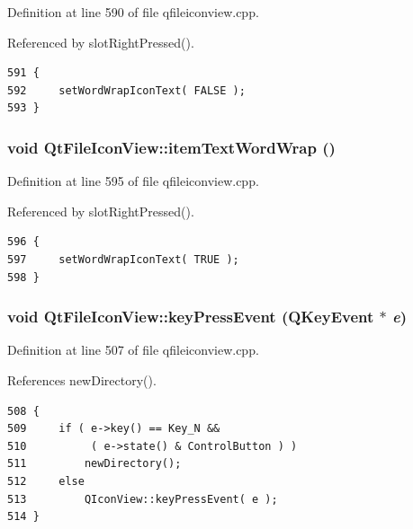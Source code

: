 Definition at line 590 of file qfileiconview.cpp.

Referenced by slot\-Right\-Pressed().



\footnotesize\begin{verbatim}591 {
592     setWordWrapIconText( FALSE );
593 }
\end{verbatim}\normalsize 
{}
\subsubsection{\setlength{\rightskip}{0pt plus 5cm}void Qt\-File\-Icon\-View::item\-Text\-Word\-Wrap ()\hspace{0.3cm}{\tt  [protected, slot]}}\label{classQtFileIconView_QtFileIconViewj10}




Definition at line 595 of file qfileiconview.cpp.

Referenced by slot\-Right\-Pressed().



\footnotesize\begin{verbatim}596 {
597     setWordWrapIconText( TRUE );
598 }
\end{verbatim}\normalsize 
{}
\subsubsection{\setlength{\rightskip}{0pt plus 5cm}void Qt\-File\-Icon\-View::key\-Press\-Event (QKey\-Event $\ast$ {\em e})\hspace{0.3cm}{\tt  [protected, virtual]}}\label{classQtFileIconView_QtFileIconViewb2}




Definition at line 507 of file qfileiconview.cpp.

References new\-Directory().



\footnotesize\begin{verbatim}508 {
509     if ( e->key() == Key_N &&
510          ( e->state() & ControlButton ) )
511         newDirectory();
512     else
513         QIconView::keyPressEvent( e );
514 }
\end{verbatim}\normalsize 
{}
